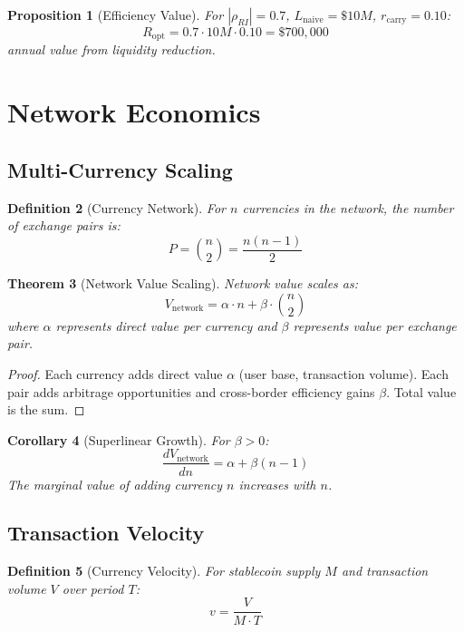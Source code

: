 \documentclass[12pt]{article}
\newtheorem{theorem}{Theorem}
\newtheorem{definition}[theorem]{Definition}
\newtheorem{proposition}[theorem]{Proposition}
\newtheorem{corollary}[theorem]{Corollary}
\begin{document}
\begin{proposition}[Efficiency Value]
For $|\rho_{RI}| = 0.7$, $L_{\text{naive}} = \$10M$, $r_{\text{carry}} = 0.10$:
$$
R_{\text{opt}} = 0.7 \cdot 10M \cdot 0.10 = \$700,000
$$
annual value from liquidity reduction.
\end{proposition}

\section{Network Economics}

\subsection{Multi-Currency Scaling}

\begin{definition}[Currency Network]
For $n$ currencies in the network, the number of exchange pairs is:
$$
P = \binom{n}{2} = \frac{n(n-1)}{2}
$$
\end{definition}

\begin{theorem}[Network Value Scaling]
Network value scales as:
$$
V_{\text{network}} = \alpha \cdot n + \beta \cdot \binom{n}{2}
$$
where $\alpha$ represents direct value per currency and $\beta$ represents value per exchange pair.
\end{theorem}

\begin{proof}
Each currency adds direct value $\alpha$ (user base, transaction volume). Each pair adds arbitrage opportunities and cross-border efficiency gains $\beta$. Total value is the sum.
\end{proof}

\begin{corollary}[Superlinear Growth]
For $\beta > 0$:
$$
\frac{dV_{\text{network}}}{dn} = \alpha + \beta(n-1)
$$
The marginal value of adding currency $n$ increases with $n$.
\end{corollary}

\subsection{Transaction Velocity}

\begin{definition}[Currency Velocity]
For stablecoin supply $M$ and transaction volume $V$ over period $T$:
$$
v = \frac{V}{M \cdot T}
$$
\end{definition}
\end{document}
